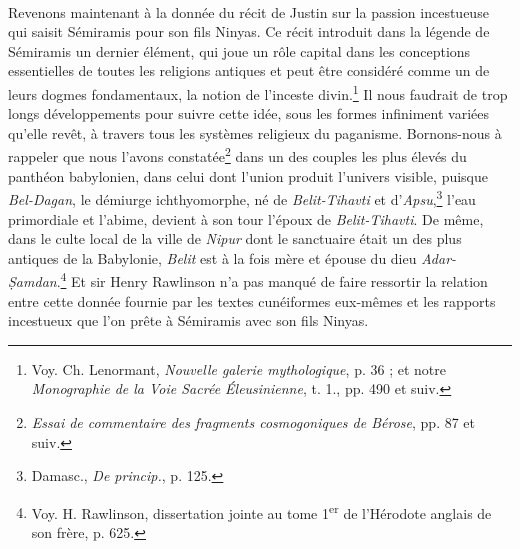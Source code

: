 \documentclass[a4paper, 11pt, oneside, landscape]{article}
\begin{document}
\paragraph{}
Revenons maintenant à la donnée du récit de Justin sur la passion incestueuse qui saisit Sémiramis pour son fils Ninyas. Ce récit introduit dans la légende de Sémiramis un dernier élément, qui joue un rôle capital dans les conceptions essentielles de toutes les religions antiques et peut être considéré comme un de leurs dogmes fondamentaux, la notion de l'inceste divin.\footnote{Voy. Ch. Lenormant, \emph{Nouvelle galerie mythologique}, p. 36 ; et notre \emph{Monographie de la Voie Sacrée Éleusinienne}, t. 1., pp. 490 et suiv.} Il nous faudrait de trop longs développements pour suivre cette idée, sous les formes infiniment variées qu'elle revêt, à travers tous les systèmes religieux du paganisme. Bornons-nous à rappeler que nous l'avons constatée\footnote{\emph{Essai de commentaire des fragments cosmogoniques de Bérose}, pp. 87 et suiv.} dans un des couples les plus élevés du panthéon babylonien, dans celui dont l'union produit l'univers visible, puisque \emph{Bel-Dagan}, le démiurge ichthyomorphe, né de \emph{Belit-Tihavti} et d'\emph{Apsu},\footnote{Damasc., \emph{De princip.}, p. 125.} l'eau primordiale et l'abime, devient à son tour l'époux de \emph{Belit-Tihavti}. De même, dans le culte local de la ville de \emph{Nipur} dont le sanctuaire était un des plus antiques de la Babylonie, \emph{Belit} est à la fois mère et épouse du dieu \emph{Adar-\d{S}amdan}.\footnote{Voy. H. Rawlinson, dissertation jointe au tome 1\textsuperscript{er} de l'Hérodote anglais de son frère, p. 625.} Et sir Henry Rawlinson n'a pas manqué de faire ressortir la relation entre cette donnée fournie par les textes cunéiformes eux-mêmes et les rapports incestueux que l'on prête à Sémiramis avec son fils Ninyas.
\end{document}

